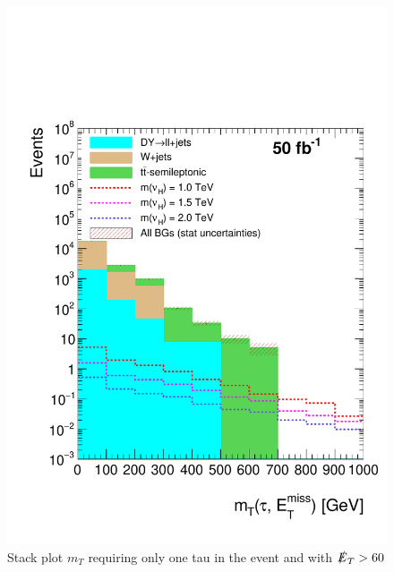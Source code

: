 \begin{figure}
\centering
\includegraphics[width=\linewidth]{StackPlots/mT_1Tau_met60_50ifb.pdf}
\caption{Stack plot $m_{T}$ requiring only one tau in the event and with $\slashed{E}_{T} > 60$}
\label{fig: mjj2tauMet50}
\end{figure}

